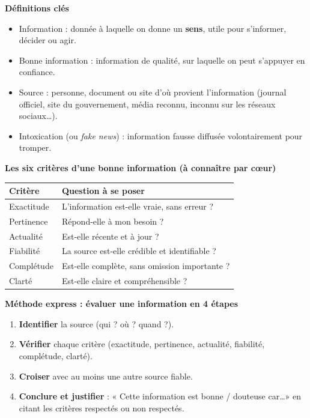 \documentclass[11pt]{article}
\newcommand{\cle}[1]{{\popxbold\color{popdark}#1}}
\begin{document}
\begin{bilan}
\textbf{Définitions clés}
\begin{itemize}
  \item \cle{Information} : donnée à laquelle on donne un \textbf{sens}, utile pour s'informer, décider ou agir.
  \item \cle{Bonne information} : information de qualité, sur laquelle on peut s'appuyer en confiance.
  \item \cle{Source} : personne, document ou site d'où provient l'information (journal officiel, site du gouvernement, média reconnu, inconnu sur les réseaux sociaux\ldots).
  \item \cle{Intoxication} (ou \emph{fake news}) : information fausse diffusée volontairement pour tromper.
\end{itemize}

\textbf{Les six critères d'une bonne information (à connaître par c\oe ur)}

\begin{center}
\begin{tabularx}{\linewidth}{|l|X|}
\hline
\rowcolor{popblueL} \textbf{Critère} & \textbf{Question à se poser} \\
\hline
\cle{Exactitude} & L'information est-elle vraie, sans erreur ? \\
\hline
\cle{Pertinence} & Répond-elle à mon besoin ? \\
\hline
\cle{Actualité} & Est-elle récente et à jour ? \\
\hline
\cle{Fiabilité} & La source est-elle crédible et identifiable ? \\
\hline
\cle{Complétude} & Est-elle complète, sans omission importante ? \\
\hline
\cle{Clarté} & Est-elle claire et compréhensible ? \\
\hline
\end{tabularx}
\end{center}

\textbf{Méthode express : évaluer une information en 4 étapes}
\begin{enumerate}
  \item \textbf{Identifier} la source (qui ? où ? quand ?).
  \item \textbf{Vérifier} chaque critère (exactitude, pertinence, actualité, fiabilité, complétude, clarté).
  \item \textbf{Croiser} avec au moins une autre source fiable.
  \item \textbf{Conclure et justifier} : « Cette information est bonne / douteuse car\ldots » en citant les critères respectés ou non respectés.
\end{enumerate}
\end{bilan}
\end{document}
